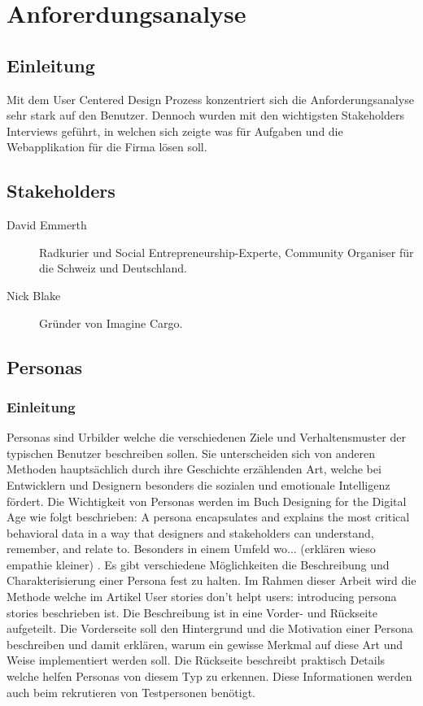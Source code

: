 \chapter{Anforerdungsanalyse}
\label{sec:anforderungsanalyse}


\section{Einleitung}
Mit dem User Centered Design Prozess konzentriert sich die Anforderungsanalyse sehr stark auf den Benutzer. Dennoch wurden mit den wichtigsten Stakeholders Interviews geführt, in welchen sich zeigte was für Aufgaben und die Webapplikation für die Firma lösen soll.


\section{Stakeholders}
\begin{description}
	\item[David Emmerth] Radkurier und Social Entrepreneurship-Experte, Community Organiser für die Schweiz und Deutschland.
	\item[Nick Blake] Gründer von Imagine Cargo.
\end{description}

\section{Personas}
\label{sec:personas}

\subsection{Einleitung}
Personas sind Urbilder welche die verschiedenen Ziele und Verhaltensmuster der typischen Benutzer beschreiben sollen. Sie unterscheiden sich von anderen Methoden hauptsächlich durch ihre Geschichte erzählenden Art, welche bei Entwicklern und Designern besonders die sozialen und emotionale Intelligenz fördert. Die Wichtigkeit von Personas werden im Buch Designing for the Digital Age \citep[chapter 11]{goodwin2011designing} wie folgt beschrieben: \glqq A persona encapsulates and explains the most critical behavioral data in a way that designers and stakeholders can understand, remember, and relate to\grqq. Besonders in einem Umfeld wo... (erklären wieso empathie kleiner) \citep{hudson2009empathy}.
\newline{}
Es gibt verschiedene Möglichkeiten die Beschreibung und Charakterisierung einer Persona fest zu halten. Im Rahmen dieser Arbeit wird die Methode welche im Artikel \citep{interactions.acm2013online} \glqq User stories don't helpt users: introducing persona stories \grqq beschrieben ist. Die Beschreibung ist in eine Vorder- und Rückseite aufgeteilt. Die Vorderseite soll den Hintergrund und die Motivation einer Persona beschreiben und damit erklären, warum ein gewisse Merkmal auf diese Art und Weise implementiert werden soll. Die Rückseite beschreibt praktisch Details welche helfen Personas von diesem Typ zu erkennen. Diese Informationen werden auch beim rekrutieren von Testpersonen benötigt.

